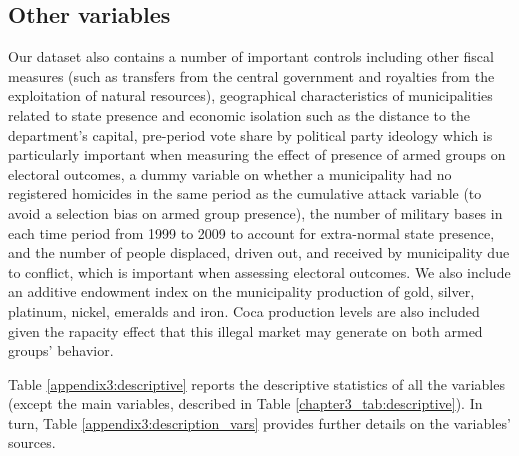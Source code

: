 \subsection{Other variables \label{appendix3:other_vars}}

Our dataset also contains a number of important controls including other fiscal measures  (such as transfers from the central government and royalties from the exploitation of natural resources), geographical characteristics of municipalities related to state presence and economic isolation such as the distance to the department's capital, pre-period vote share by political party ideology which is particularly important when measuring the effect of presence of armed groups on electoral outcomes, a dummy variable on whether a municipality had no registered homicides in the same period as the cumulative attack variable (to avoid a selection bias on armed group presence), the number of military bases in each time period from 1999 to 2009 to account for extra-normal state presence, and the number of people displaced, driven out, and received  by municipality due to conflict, which is important when assessing electoral outcomes. We also include an additive endowment index on the municipality production of gold, silver, platinum, nickel, emeralds and iron. Coca production levels are also included given the rapacity effect that this illegal market may generate on both armed groups' behavior.  

Table \ref{appendix3:descriptive} reports the descriptive statistics of all the variables (except the main variables, described in Table \ref{chapter3_tab:descriptive}). In turn, Table \ref{appendix3:description_vars} provides further details on the variables' sources.


